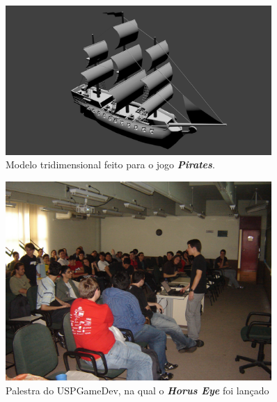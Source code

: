 \documentclass[12pt,onecolumn,a4paper]{article}
\begin{document}
        \begin{figure}[htb]
            \centering
            \includegraphics[width=0.9\textwidth]{images/pirates_02.png}
            \caption{Modelo tridimensional feito para o jogo \textit{\textbf{Pirates}}.}
            \label{fig:pirates_02}
        \end{figure}
        
        
        \begin{figure}[htb]
            \centering
            \includegraphics[width=0.9\textwidth]{images/palestra_01.jpg}
            \caption{Palestra do USPGameDev, na qual o \textit{\textbf{Horus Eye}} foi lançado}
            \label{fig:palestra_01}
        \end{figure}
        
\end{document}
